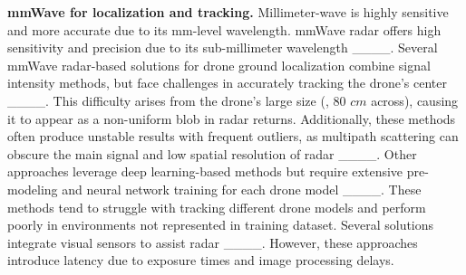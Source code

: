 \textbf{mmWave for localization and tracking.}
Millimeter-wave is highly sensitive and more accurate due to its mm-level wavelength.
mmWave radar offers high sensitivity and precision due to its sub-millimeter wavelength ____. 
Several mmWave radar-based solutions for drone ground localization combine signal intensity methods, but face challenges in accurately tracking the drone's center ____. 
This difficulty arises from the drone's large size (\eg, 80 $cm$ across), causing it to appear as a non-uniform blob in radar returns. 
Additionally, these methods often produce unstable results with frequent outliers, as multipath scattering can obscure the main signal and low spatial resolution of radar ____.
Other approaches leverage deep learning-based methods but require extensive pre-modeling and neural network training for each drone model ____. 
These methods tend to struggle with tracking different drone models and perform poorly in environments not represented in training dataset. 
Several solutions integrate visual sensors to assist radar ____. 
However, these approaches introduce latency due to exposure times and image processing delays.

